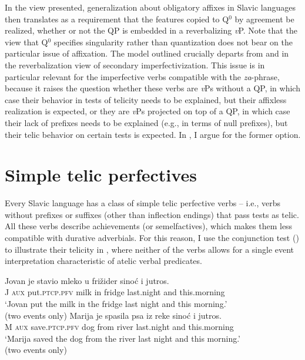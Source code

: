 \documentclass[output=paper]{langscibook}
\begin{document}
\z

\noindent In the view presented,  generalization about obligatory affixes in Slavic languages then translates as a requirement that the features copied to Q$^0$ by agreement be realized, whether or not the QP is embedded in a reverbalizing \textit{v}P. Note that the view that Q$^0$ specifies singularity rather than quantization does not bear on the particular issue of affixation. The model outlined crucially departs from \citet{Borer.2005} and \citet{Lazor.2010} in the reverbalization view of secondary imperfectivization. This issue is in particular relevant for the imperfective verbs compatible with the \textit{za}-phrase, because it raises the question whether these verbs are \textit{v}Ps without a QP, in which case their behavior in tests of telicity needs to be explained, but their affixless realization is expected, or they are \textit{v}Ps projected on top of a QP, in which case their lack of prefixes needs to be explained (e.g., in terms of null prefixes), but their telic behavior on certain tests is expected. In , I argue for the former option.


\section{Simple telic perfectives}\label{ars:sec:s-simplepref}\largerpage

Every Slavic language has a class of simple telic perfective verbs -- i.e., verbs without prefixes or suffixes (other than inflection endings) that pass tests as telic. All these verbs describe achievements (or semelfactives), which makes them less compatible with durative adverbials. For this reason, I use the conjunction test (\citealt{Verkuyl.1972}) to illustrate their telicity in , where neither of the verbs allows for a single event interpretation characteristic of atelic verbal predicates.\largerpage[1]

\ea\label{ars:ex:simplepref}
	\begin{xlist} 
		
	    \ex  \gll Jovan je stavio mleko u frižider sinoć i jutros.\\ 
J \textsc{aux} put\textsc{.ptcp.pfv} milk in fridge last.night and  this.morning \\ 
\glt `Jovan put the milk in the fridge last night and this morning.'\\\hfill(two events only) \label{ars:ex:simplepref-a}
	    \ex  \gll Marija je spasila psa iz reke sinoć i  jutros.\\ 
M \textsc{aux} save\textsc{.ptcp.pfv} dog from river  last.night and  this.morning \\ 
\glt `Marija saved the dog from the river last night and this morning.'\\\hfill (two events only) \label{ars:ex:simplepref-b}

	\end{xlist}
\z
\end{document}
